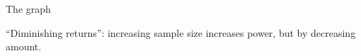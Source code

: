 \documentclass[unknownkeysallowed]{beamer}\usepackage[]{graphicx}\usepackage[]{color}
\begin{document}
\begin{frame}[fragile]{The graph}
  
  
``Diminishing returns'': increasing sample size increases power, but
by decreasing amount.  
\end{frame}

\end{document}
